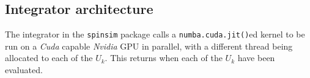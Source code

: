 \documentclass{jors}
\begin{document}

		

		
		

	\subsection{Integrator architecture}
		The integrator in the \texttt{spinsim} package calls a \texttt{numba.cuda.jit()}ed kernel to be run on a \emph{Cuda} capable \emph{Nvidia} GPU in parallel, with a different thread being allocated to each of the \(U_k\). This returns when each of the \(U_k\) have been evaluated.
		
\end{document}
